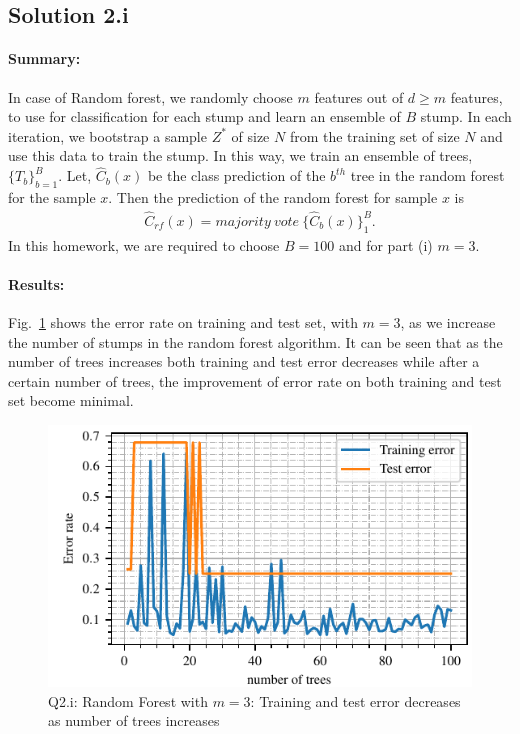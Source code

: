 \subsection*{Solution 2.i}
\paragraph{Summary:} In case of Random forest, we randomly choose $m$ features out of $d\geq m$ features, to use for classification for each stump and learn an ensemble of $B$ stump. In each iteration, we bootstrap a sample $Z^*$ of size $N$ from the training set of size $N$ and use this data to train the stump. In this way, we train an ensemble of trees, $\{T_b\}_{b=1}^{B}$. Let, $\hat{C}_b(x)$ be the class prediction of the $b^{th}$ tree in the random forest for the sample $x$. Then the prediction of the random forest for sample $x$ is
\begin{align*}
	\hat{C}_{rf}(x) = majority\ vote\ \{\hat{C}_b(x)\}_{1}^{B}.
\end{align*}
In this homework, we are required to choose $B=100$ and for part (i) $m=3$.
\paragraph{Results:}Fig.~\ref{fig:q2i_error_rate} shows the error rate on training and test set, with $m=3$, as we increase the number of stumps in the random forest algorithm. It can be seen that as the number of trees increases both training and test error decreases while after a certain number of trees, the improvement of error rate on both training and test set become minimal.
\begin{figure}[!h]
	\centering
	\includegraphics[scale=1.0,trim={0cm 0cm 0cm 0cm},clip]{./code/generatedPlots/q2i_error_rate.pdf}
	\caption{Q2.i: Random Forest with $m=3$: Training and test error decreases as number of trees increases}
	\label{fig:q2i_error_rate}
\end{figure}
